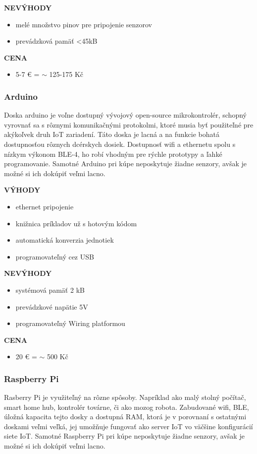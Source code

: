 \documentclass[twoside]{ctuthesis}
\theoremstyle{plain}
\theoremstyle{definition}
\theoremstyle{note}
\begin{document}
\textbf{NEVÝHODY}
\begin{itemize}
\item melé množstvo pinov pre pripojenie senzorov 
\item prevádzková pamäť <45kB
\end{itemize}

\textbf{CENA}
\begin{itemize}
\item 5-7 € = $\sim$ 125-175 Kč
\end{itemize}

\subsubsection*{Arduino}
Doska arduino je voľne dostupný vývojový open-source mikrokontrolér, schopný vyrovnať sa s rôznymi komunikačnými protokolmi, ktoré musia byť použiteľné pre akýkoľvek druh IoT zariadení. Táto doska je lacná a na funkcie bohatá dostupnosťou rôznych dcérskych dosiek. Dostupnosť wifi a ethernetu spolu s nízkym výkonom BLE-4, ho robí vhodným pre rýchle prototypy a ľahké programovanie. Samotné Arduino pri kúpe neposkytuje žiadne senzory, avšak je možné si ich dokúpiť veľmi lacno. \cite{conclusionSolution} \cite{arduino} \cite{prosconsArduino}
\newline

\textbf{VÝHODY}
\begin{itemize}
\item ethernet pripojenie
\item knižnica príkladov už s hotovým kódom
\item automatická konverzia jednotiek
\item programovateľný cez USB
\end{itemize}

\textbf{NEVÝHODY}
\begin{itemize}
\item systémová pamäť 2 kB
\item prevádzkové napätie 5V
\item programovateľný Wiring platformou
\end{itemize}

\textbf{CENA}
\begin{itemize}
\item 20 € = $\sim$ 500 Kč
\end{itemize}

\subsubsection*{Raspberry Pi}
Rasberry Pi je využiteľný na rôzne spôsoby. Napríklad ako malý stolný počítač, smart home hub, kontrolér továrne, či ako mozog robota. Zabudované wifi, BLE, úložná kapacita tejto dosky a dostupná RAM, ktorá je v porovnaní s ostatnými doskami veľmi veľká, jej umožňuje fungovať ako server IoT vo väčšine konfigurácií siete IoT. Samotné Raspberry Pi pri kúpe neposkytuje žiadne senzory, avšak je možné si ich dokúpiť veľmi lacno. \cite{conclusionSolution} \cite{raspberryPi}
\newline
\end{document}
